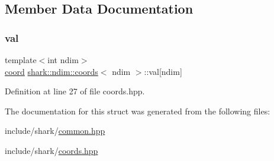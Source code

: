 \subsection{Member Data Documentation}
\hypertarget{structshark_1_1ndim_1_1coords_a425262af388367b0f0079218e038aef5}{}\label{structshark_1_1ndim_1_1coords_a425262af388367b0f0079218e038aef5} 
\subsubsection{\texorpdfstring{val}{val}}
{\footnotesize\ttfamily template$<$int ndim$>$ \\
\hyperlink{namespaceshark_a767a92d5dd82cb82266473bff42fa6d9}{coord} \hyperlink{structshark_1_1ndim_1_1coords}{shark\+::ndim\+::coords}$<$ ndim $>$\+::val\mbox{[}ndim\mbox{]}}



Definition at line 27 of file coords.\+hpp.



The documentation for this struct was generated from the following files\+:\begin{DoxyCompactItemize}
\item 
include/shark/\hyperlink{common_8hpp}{common.\+hpp}\item 
include/shark/\hyperlink{coords_8hpp}{coords.\+hpp}\end{DoxyCompactItemize}
